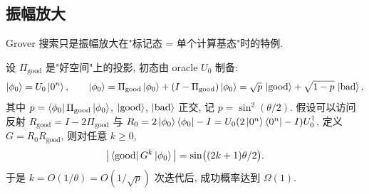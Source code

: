 \documentclass[utf8]{article} %
\numberwithin{equation}{section}   %
\newtheorem{Thm}{\hskip 2em {\color{blue} 定理}}[subsection]
\begin{document}
\subsection{振幅放大}

Grover 搜索只是振幅放大在"标记态 = 单个计算基态"时的特例.

\begin{Thm}[振幅放大] \label{thm:AA}
    设 $\Pi_{\mathrm{good}}$ 是"好空间"上的投影, 初态由 oracle $U_0$ 制备:
    \begin{equation}
        \ket{\phi_0} = U_0 \ket{0^n}, \qquad
        \ket{\phi_0} = \Pi_{\mathrm{good}}\ket{\phi_0} + (I - \Pi_{\mathrm{good}})\ket{\phi_0}
        = \sqrt{p}\,\ket{\mathrm{good}} + \sqrt{1-p}\,\ket{\mathrm{bad}},
    \end{equation}
    其中 $p = \bra{\phi_0}\Pi_{\mathrm{good}}\ket{\phi_0}$, $\ket{\mathrm{good}}$,
    $\ket{\mathrm{bad}}$ 正交, 记 $p = \sin^2(\theta/2)$.
    假设可以访问反射 $R_{\mathrm{good}} = I - 2\Pi_{\mathrm{good}}$ 与
    $R_0 = 2\ket{\phi_0}\bra{\phi_0} - I = U_0(2\ket{0^n}\bra{0^n} - I)U_0^\dagger$,
    定义 $G = R_0 R_{\mathrm{good}}$, 则对任意 $k \ge 0$,
    \begin{equation}
        \big|\bra{\mathrm{good}} G^k \ket{\phi_0}\big| = \sin\!\big((2k+1)\theta/2\big).
    \end{equation}
    于是 $k = O(1/\theta) = O(1/\sqrt{p})$ 次迭代后, 成功概率达到 $\Omega(1)$.
\end{Thm}
\end{document}
